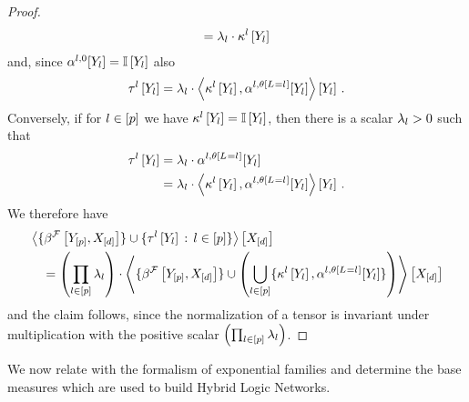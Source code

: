 \begin{proof}
\begin{align*}
        = \lambda_{l} \cdot \kappa^{l}\left[Y_{l}\right]
    \end{align*}
    and, since $\alpha^{l,0}[Y_{l}] = \mathbb{I}\left[Y_{l}\right]$ also
    \begin{align*}
        \tau^{l}\left[Y_{l}\right]
        = \lambda_{l} \cdot \left\langle \kappa^{l}\left[Y_{l}\right],\alpha^{l,\theta\left[L_{}=l_{}\right]}[Y_{l}]\right\rangle \left[ Y_{l} \right] \, .
    \end{align*}
    Conversely, if for $l\in[p]$ we have $\kappa^{l}\left[Y_{l}\right]=\mathbb{I}\left[Y_{l}\right]$, then there is a scalar $\lambda_{l}>0$ such that
    \begin{align*}
        \tau^{l}\left[Y_{l}\right]
        &= \lambda_{l} \cdot \alpha^{l,\theta\left[L_{}=l_{}\right]}[Y_{l}] \\
        &= \lambda_{l} \cdot \left\langle \kappa^{l}\left[Y_{l}\right],\alpha^{l,\theta\left[L_{}=l_{}\right]}[Y_{l}]\right\rangle \left[ Y_{l} \right] \, . \\
    \end{align*}
    We therefore have
    \begin{align*}
        &\left\langle 
            \{\beta^{\mathcal{F}}\left[Y_{[p]},X_{[d]}\right]\}
            \cup \{\tau^{l}\left[Y_{l}\right]\,:\,l\in[p]\}
        \right\rangle \left[ X_{[d]} \right]\\
        &\quad =\left(\prod_{l\in[p]}\lambda_{l}\right)\cdot\left\langle 
            \{\beta^{\mathcal{F}}\left[Y_{[p]},X_{[d]}\right]\}
            \cup \left(\bigcup_{l\in[p]}\{\kappa^{l}\left[Y_{l}\right],\alpha^{l,\theta\left[L_{}=l_{}\right]}[Y_{l}]\}\right)
        \right\rangle \left[ X_{[d]} \right]
    \end{align*}
    and the claim follows, since the normalization of a tensor is invariant under multiplication with the positive scalar $\left(\prod_{l\in[p]}\lambda_{l}\right)$.
\end{proof}

We now relate with the formalism of exponential families and determine the base measures which are used to build Hybrid Logic Networks.


